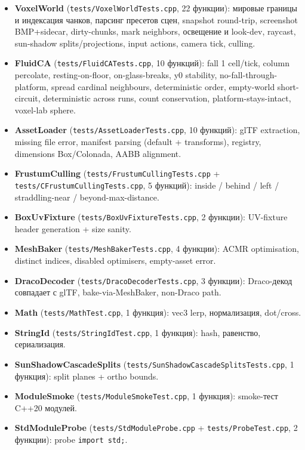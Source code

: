 \documentclass[
  11pt,a4paper,oneside]{article}
\providecommand{\tightlist}{%
  \setlength{\itemsep}{0pt}\setlength{\parskip}{0pt}}
\providecommand{\tightlist}{%
  \setlength{\itemsep}{0pt}\setlength{\parskip}{0pt}}
\begin{document}
\begin{itemize}
\tightlist
\item
  \textbf{VoxelWorld} (\texttt{tests/VoxelWorldTests.cpp}, 22 функции): мировые границы и индексация чанков, парсинг пресетов сцен, snapshot round-trip, screenshot BMP+sidecar, dirty-chunks, mark neighbors, освещение и look-dev, raycast, sun-shadow splits/projections, input actions, camera tick, culling.
\item
  \textbf{FluidCA} (\texttt{tests/FluidCATests.cpp}, 10 функций): fall 1 cell/tick, column percolate, resting-on-floor, on-glass-breaks, y0 stability, no-fall-through-platform, spread cardinal neighbours, deterministic order, empty-world short-circuit, deterministic across runs, count conservation, platform-stays-intact, voxel-lab sphere.
\item
  \textbf{AssetLoader} (\texttt{tests/AssetLoaderTests.cpp}, 10 функций): glTF extraction, missing file error, manifest parsing (default + transforms), registry, dimensions Box/Colonada, AABB alignment.
\item
  \textbf{FrustumCulling} (\texttt{tests/FrustumCullingTests.cpp} + \texttt{tests/CFrustumCullingTests.cpp}, 5 функций): inside / behind / left / straddling-near / beyond-max-distance.
\item
  \textbf{BoxUvFixture} (\texttt{tests/BoxUvFixtureTests.cpp}, 2 функции): UV-fixture header generation + size sanity.
\item
  \textbf{MeshBaker} (\texttt{tests/MeshBakerTests.cpp}, 4 функции): ACMR optimisation, distinct indices, disabled optimisers, empty-asset error.
\item
  \textbf{DracoDecoder} (\texttt{tests/DracoDecoderTests.cpp}, 3 функции): Draco-декод совпадает с glTF, bake-via-MeshBaker, non-Draco path.
\item
  \textbf{Math} (\texttt{tests/MathTest.cpp}, 1 функция): vec3 lerp, нормализация, dot/cross.
\item
  \textbf{StringId} (\texttt{tests/StringIdTest.cpp}, 1 функция): hash, равенство, сериализация.
\item
  \textbf{SunShadowCascadeSplits} (\texttt{tests/SunShadowCascadeSplitsTests.cpp}, 1 функция): split planes + ortho bounds.
\item
  \textbf{ModuleSmoke} (\texttt{tests/ModuleSmokeTest.cpp}, 1 функция): smoke-тест C++20 модулей.
\item
  \textbf{StdModuleProbe} (\texttt{tests/StdModuleProbe.cpp} + \texttt{tests/ProbeTest.cpp}, 2 функции): probe \texttt{import\ std;}.
\end{itemize}
\end{document}

